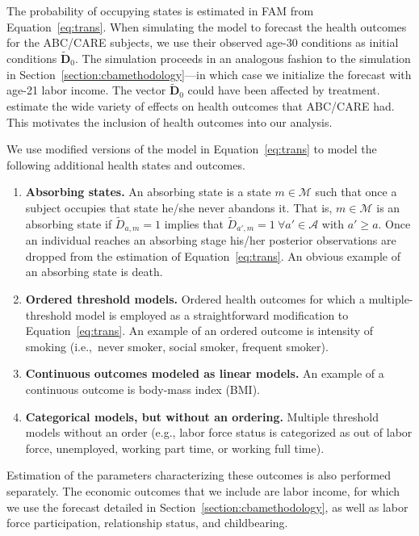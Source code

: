 The probability of occupying states is estimated in FAM from Equation~\eqref{eq:trans}. When simulating the model to forecast the health outcomes for the ABC/CARE subjects, we use their observed age-30 conditions as initial conditions  $\tilde{\bm{D}}_0$. The simulation proceeds in an analogous fashion to the simulation in Section~\ref{section:cbamethodology}---in which case we initialize the forecast with age-21 labor income. The vector $\tilde{\bm{D}}_0$ could have been affected by treatment. \citet{Campbell_Conti_etal_2014_EarlyChildhoodInvestments} estimate the wide variety of effects on health outcomes that ABC/CARE had. This motivates the inclusion of health outcomes into our analysis.

We use modified versions of the model in Equation~\eqref{eq:trans} to model the following additional health states and outcomes.

\begin{enumerate}
\item \textbf{Absorbing states.} An absorbing state is a state $m \in \mathcal{M}$ such that once a subject occupies that state he/she never abandons it. That is, $m \in \mathcal{M}$ is an absorbing state if $\tilde{D}_{a,m} = 1$ implies that $\tilde{D}_{a',m} = 1 \ \forall a' \in \mathcal{A}$ with $a' \geq a.$ Once an individual reaches an absorbing stage his/her posterior observations are dropped from the estimation of Equation~\eqref{eq:trans}. An obvious example of an absorbing state is death.
\item \textbf{Ordered threshold models.} Ordered health outcomes for which a multiple-threshold model is employed as a straightforward modification to Equation~\eqref{eq:trans}. An example of an ordered outcome is intensity of smoking (i.e.,\ never smoker, social smoker, frequent smoker).
\item \textbf{Continuous outcomes modeled as linear models.} An example of a continuous outcome is body-mass index (BMI).
\item \textbf{Categorical models, but without an ordering.} Multiple threshold models without an order (e.g., labor force status is categorized as out of labor force, unemployed, working part time, or working full time).
\end{enumerate}

Estimation of the parameters characterizing these outcomes is also performed separately. The economic outcomes that we include are labor income, for which we use the forecast detailed in Section~\ref{section:cbamethodology}, as well as labor force participation, relationship status, and childbearing. 

